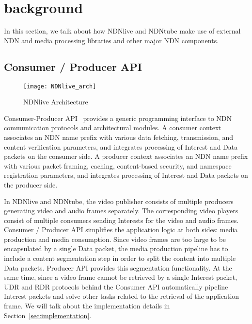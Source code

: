 


\section{background} %
In this section, we talk about how NDNlive and NDNtube make use of external NDN and media processing libraries and other major NDN components. 

\label{sec:background}
\subsection{Consumer / Producer API}
\label{ssub:cpapi}

\begin{figure*}
  \centering
  \texttt{[image: NDNlive\_arch]}
  \caption{NDNlive Architecture}
  \label{fig:NDNlive_arch}
\end{figure*}

Consumer-Producer API~\cite{api-tr} provides a generic programming interface to NDN communication protocols and architectural modules. A consumer context associates an NDN name prefix with various data fetching, transmission, and content verification parameters, and integrates processing of Interest and Data packets on the consumer side. A producer context associates an NDN name prefix with various packet framing, caching, content-based security, and namespace registration parameters, and integrates processing of Interest and Data packets on the producer side.

In NDNlive and NDNtube, the video publisher consists of multiple producers generating video and audio frames separately. The corresponding video players consist of multiple consumers sending Interests for the video and audio frames. Consumer / Producer API simplifies the application logic at both sides: media production and media consumption. Since video frames are too large to be encapsulated by a single Data packet, the media production pipeline has to include a content segmentation step in order to split the content into multiple Data packets. Producer API provides this segmentation functionality. At the same time, since a video frame cannot be retrieved by a single Interest packet, UDR and RDR protocols behind the Consumer API automatically pipeline Interest packets and solve other tasks related to the retrieval of the application frame. 
We will talk about the implementation details in Section~\ref{sec:implementation}.

